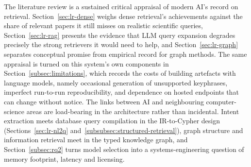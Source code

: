 The literature review is a sustained critical appraisal of modern AI's
record on retrieval. Section~\ref{sec:lr-dense} weighs dense retrieval's
achievements against the share of relevant papers it still misses on
realistic scientific queries, Section~\ref{sec:lr-rag} presents the
evidence that LLM query expansion degrades precisely the strong retrievers
it would need to help, and Section~\ref{sec:lr-graph} separates conceptual
promise from empirical record for graph methods. The same appraisal is
turned on this system's own components in Section~\ref{subsec:limitations},
which records the costs of building artefacts with language models, namely
occasional generation of unsupported keyphrases, imperfect run-to-run
reproducibility, and dependence on hosted endpoints that can change without
notice. The links between AI and neighbouring computer-science areas are
load-bearing in the architecture rather than incidental. Intent extraction
meets database query compilation in the IR-to-Cypher design
(Sections~\ref{sec:lr-nl2q} and~\ref{subsubsec:structured-retrieval}), graph structure and
information retrieval meet in the typed knowledge graph, and
Section~\ref{subsec:rq2} turns model selection into a systems-engineering
question of memory footprint, latency and licensing.